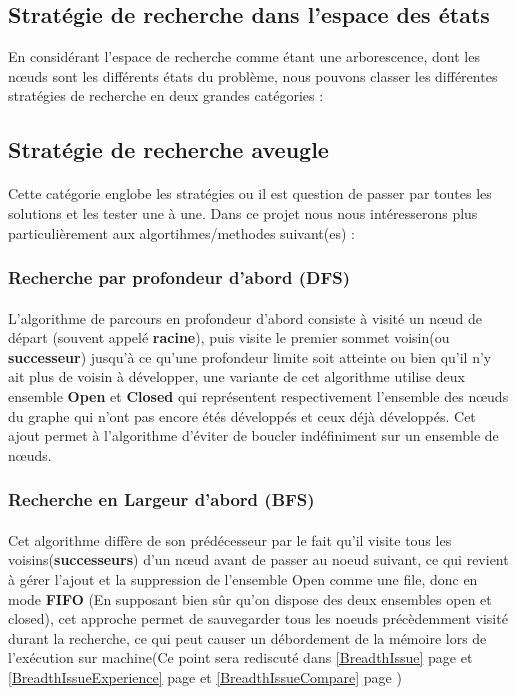 \subsection{Stratégie de recherche dans l'espace des états}
En considérant l'espace de recherche comme étant une arborescence, dont les nœuds sont les différents états du problème, nous pouvons classer les différentes stratégies de recherche en deux grandes catégories :
\subsection{Stratégie de recherche aveugle}
\paragraph{}Cette catégorie englobe les stratégies ou il est question de passer par toutes les solutions et les tester une à une. Dans ce projet nous nous intéresserons plus particulièrement aux algortihmes/methodes suivant(es) :  
\subsubsection{Recherche par profondeur d'abord (DFS)}\label{DFSdef}
\paragraph{}
L'algorithme de parcours en profondeur d'abord consiste à visité un nœud de départ (souvent appelé \textbf{racine}), puis visite le premier sommet voisin(ou \textbf{successeur}) jusqu'à ce qu'une profondeur limite soit atteinte ou bien qu'il n'y ait plus de voisin à développer, une variante de cet algorithme utilise deux ensemble \textbf{Open} et \textbf{Closed} qui représentent respectivement l'ensemble des nœuds du graphe qui n'ont pas encore étés développés et ceux déjà développés. Cet ajout permet à l'algorithme d'éviter de boucler indéfiniment sur un ensemble de nœuds.

\subsubsection{Recherche en Largeur d'abord (BFS)}\label{BFSdef}
\paragraph{}
Cet algorithme diffère de son prédécesseur par le fait qu'il visite tous les voisins(\textbf{successeurs}) d'un nœud avant de passer au noeud suivant, ce qui revient à gérer l'ajout et la suppression de l'ensemble Open comme une file, donc en mode \textbf{FIFO} (En supposant bien sûr qu'on dispose des deux ensembles open et closed), cet approche permet de sauvegarder tous les noeuds précèdemment visité durant la recherche, ce qui peut causer un débordement de la mémoire lors de l'exécution sur machine(Ce point sera rediscuté dans \ref{BreadthIssue} page \pageref{BreadthIssue} et \ref{BreadthIssueExperience} page \pageref{BreadthIssueExperience} et \ref{BreadthIssueCompare} page \pageref{BreadthIssueCompare})

